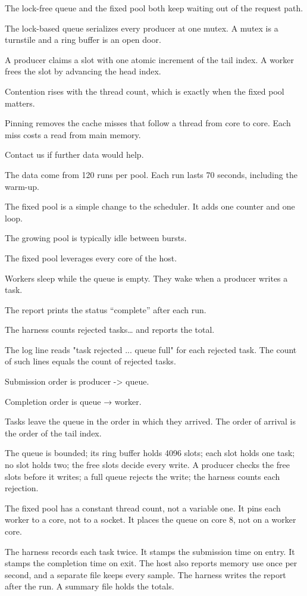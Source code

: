 The lock-free queue and the fixed pool both keep waiting out of the request path.

The lock-based queue serializes every producer at one mutex. A mutex is a turnstile and a ring buffer is an open door.

A producer claims a slot with one atomic increment of the tail index. A worker frees the slot by advancing the head index.

Contention rises with the thread count, which is exactly when the fixed pool matters.

Pinning removes the cache misses that follow a thread from core to core. Each miss costs a read from main memory.

Contact us if further data would help.

The data come from 120 runs per pool. Each run lasts 70 seconds, including the warm-up.

The fixed pool is a simple change to the scheduler. It adds one counter and one loop.

The growing pool is typically idle between bursts.

The fixed pool leverages every core of the host.

Workers sleep while the queue is empty. They wake when a producer writes a task.

The report prints the status “complete” after each run.

The harness counts rejected tasks… and reports the total.

The log line reads "task rejected ... queue full" for each rejected task. The count of such lines equals the count of rejected tasks.

Submission order is producer -> queue.

Completion order is queue → worker.

Tasks leave the queue in the order in which they arrived. The order of arrival is the order of the tail index.

The queue is bounded; its ring buffer holds 4096 slots; each slot holds one task; no slot holds two; the free slots decide every write. A producer checks the free slots before it writes; a full queue rejects the write; the harness counts each rejection.

The fixed pool has a constant thread count, not a variable one. It pins each worker to a core, not to a socket. It places the queue on core 8, not on a worker core.

The harness records each task twice. It stamps the submission time on entry. It stamps the completion time on exit. The host also reports memory use once per second, and a separate file keeps every sample. The harness writes the report after the run. A summary file holds the totals.

